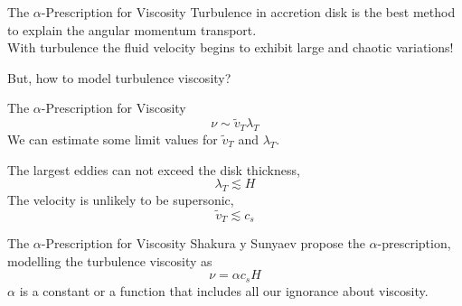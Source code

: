 \documentclass{beamer}
\begin{document}
\begin{frame}{The $\alpha$-Prescription for Viscosity}
	Turbulence in accretion disk is the best method to explain the angular momentum transport.\\
	With turbulence the fluid velocity begins to exhibit large and chaotic variations!\\
	\bigskip
	\pause
	
	But, how to model turbulence viscosity?
\end{frame}

\begin{frame}{The $\alpha$-Prescription for Viscosity}
	\[ \nu \sim \tilde{v}_T \lambda _T \]
	\pause
	We can estimate some limit values for $\tilde{v}_T$ and $\lambda _T$.\\
	\bigskip
	\pause
	
	The largest eddies can not exceed the disk thickness,
	\[ \lambda _T \lesssim H \]
	\pause
	\bigskip
	The velocity is unlikely  to be supersonic,
	\[ \tilde{v} _T \lesssim c_s \]
\end{frame}

\begin{frame}{The $\alpha$-Prescription for Viscosity}
	Shakura y Sunyaev propose the $\alpha$-prescription, modelling the turbulence viscosity as 
	\pause
	\[ \nu = \alpha c_s H \]
	\pause
	$\alpha$ is a constant or a function that includes all our ignorance about viscosity.
\end{frame}
\end{document}
